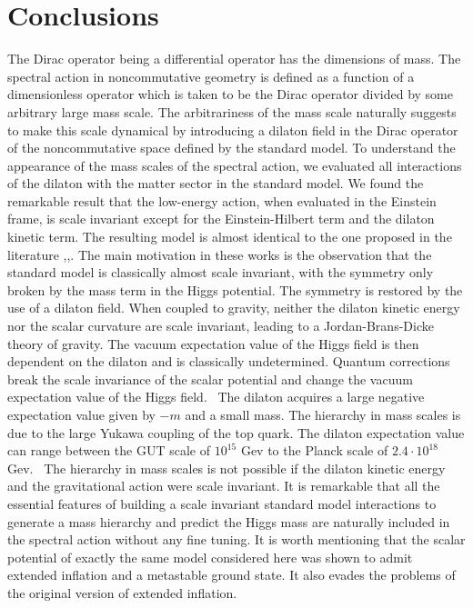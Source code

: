 \documentclass[12pt]{article}%
\begin{document}
\section{Conclusions}

The Dirac operator being a differential operator has the dimensions of mass.
The spectral action in noncommutative geometry is defined as a function of a
dimensionless operator which is taken to be the Dirac operator divided by some
arbitrary large mass scale. The arbitrariness of the mass scale naturally
suggests to make this scale dynamical by introducing a dilaton field in the
Dirac operator of the noncommutative space defined by the standard model. To
understand the appearance of the mass scales of the spectral action, we
evaluated all interactions of the dilaton with the matter sector in the
standard model. We found the remarkable result that the low-energy action,
when evaluated in the Einstein frame, is scale invariant except for the
Einstein-Hilbert term and the dilaton kinetic term. The resulting model is
almost identical to the one proposed in the literature \cite{Bubu}%
,\cite{Bud},\cite{Kolb}. The main motivation in these works is the observation
that the standard model is classically almost scale invariant, with the
symmetry only broken by the mass term in the Higgs potential. The symmetry is
restored by the use of a dilaton field. When coupled to gravity, neither the
dilaton kinetic energy nor the scalar curvature are scale invariant, leading
to a Jordan-Brans-Dicke theory of gravity. The vacuum expectation value of the
Higgs field is then dependent on the dilaton and is classically undetermined.
Quantum corrections break the scale invariance of the scalar potential and
change the vacuum expectation value of the Higgs field. \ The dilaton acquires
a large negative expectation value given by $-m$ and a small mass. The
hierarchy in mass scales is due to the large Yukawa coupling of the top quark.
The dilaton expectation value can range between the GUT scale of $10^{15}$ Gev
to the Planck scale of $2.4\cdot10^{18}$ Gev. \ The hierarchy in mass scales
is not possible if the dilaton kinetic energy and the gravitational action
were scale invariant. It is remarkable that all the essential features of
building a scale invariant standard model interactions to generate a mass
hierarchy and predict the Higgs mass are naturally included in the spectral
action without any fine tuning. It is worth mentioning that the scalar
potential of exactly the same model considered here was shown to admit
extended inflation and a metastable ground state. It also evades the problems
of the original version of extended inflation.
\end{document}
